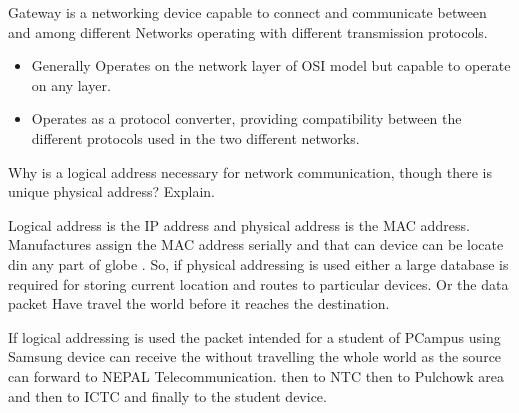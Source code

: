 \documentclass[a4paper,11pt]{article}
\begin{document}
\begin{A}
{\begin{itemize}
                  Gateway is a networking device capable to connect and communicate between and among different Networks operating with different transmission protocols.
                  \begin{itemize}
                      \item Generally Operates on the network layer of OSI model but capable to operate on any layer.
                      \item Operates as a protocol converter, providing compatibility between the different protocols used in the two different networks.
                  \end{itemize}

        \end{itemize}
    }
\end{A}

\begin{Q}
    {
        Why is a logical address necessary for network communication, though there is unique
        physical address? Explain.
    }
\end{Q}
\begin{A}
    {
        Logical address is the IP address and physical address is the MAC address.  Manufactures assign the MAC address serially and that can device can be locate din any part of globe . So, if physical addressing is used either a large database is required for storing current location and routes to particular devices. Or the data packet Have  travel the world before it reaches the destination.

        If logical addressing is used the packet intended for a student of PCampus using Samsung device can receive the without travelling the whole world  as the source can forward to NEPAL Telecommunication. then to NTC then to Pulchowk area and then to ICTC and finally to the student device.
    }
\end{A}
\end{document}
